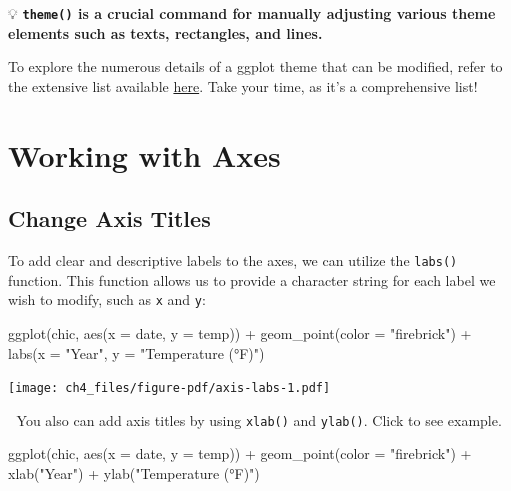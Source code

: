 \documentclass[
  letterpaper,
  DIV=11,
  numbers=noendperiod]{scrreprt}
\newenvironment{Shaded}{\begin{snugshade}}{\end{snugshade}}
\newcommand{\AttributeTok}[1]{\textcolor[rgb]{0.40,0.45,0.13}{#1}}
\newcommand{\FunctionTok}[1]{\textcolor[rgb]{0.28,0.35,0.67}{#1}}
\newcommand{\NormalTok}[1]{\textcolor[rgb]{0.00,0.23,0.31}{#1}}
\newcommand{\SpecialCharTok}[1]{\textcolor[rgb]{0.37,0.37,0.37}{#1}}
\newcommand{\StringTok}[1]{\textcolor[rgb]{0.13,0.47,0.30}{#1}}
\begin{document}
💡 \textbf{\texttt{theme()} is a crucial command for manually adjusting
various theme elements such as texts, rectangles, and lines.}

To explore the numerous details of a ggplot theme that can be modified,
refer to the extensive list available
\href{https://ggplot2.tidyverse.org/reference/theme.html}{here}. Take
your time, as it's a comprehensive list!


\chapter{Working with Axes}\label{axes}

\section{Change Axis Titles}\label{change-axis-titles}

To add clear and descriptive labels to the axes, we can utilize the
\texttt{labs()} function. This function allows us to provide a character
string for each label we wish to modify, such as \texttt{x} and
\texttt{y}:

\begin{Shaded}
\begin{Highlighting}[]
\FunctionTok{ggplot}\NormalTok{(chic, }\FunctionTok{aes}\NormalTok{(}\AttributeTok{x =}\NormalTok{ date, }\AttributeTok{y =}\NormalTok{ temp)) }\SpecialCharTok{+}
  \FunctionTok{geom\_point}\NormalTok{(}\AttributeTok{color =} \StringTok{"firebrick"}\NormalTok{) }\SpecialCharTok{+}
  \FunctionTok{labs}\NormalTok{(}\AttributeTok{x =} \StringTok{"Year"}\NormalTok{, }\AttributeTok{y =} \StringTok{"Temperature (°F)"}\NormalTok{)}
\end{Highlighting}
\end{Shaded}

\texttt{[image: ch4\_files/figure-pdf/axis-labs-1.pdf]}

💁 You also can add axis titles by using \texttt{xlab()} and
\texttt{ylab()}. Click to see example.

\begin{Shaded}
\begin{Highlighting}[]
\FunctionTok{ggplot}\NormalTok{(chic, }\FunctionTok{aes}\NormalTok{(}\AttributeTok{x =}\NormalTok{ date, }\AttributeTok{y =}\NormalTok{ temp)) }\SpecialCharTok{+}
  \FunctionTok{geom\_point}\NormalTok{(}\AttributeTok{color =} \StringTok{"firebrick"}\NormalTok{) }\SpecialCharTok{+}
  \FunctionTok{xlab}\NormalTok{(}\StringTok{"Year"}\NormalTok{) }\SpecialCharTok{+}
  \FunctionTok{ylab}\NormalTok{(}\StringTok{"Temperature (°F)"}\NormalTok{)}
\end{Highlighting}
\end{Shaded}
\end{document}
